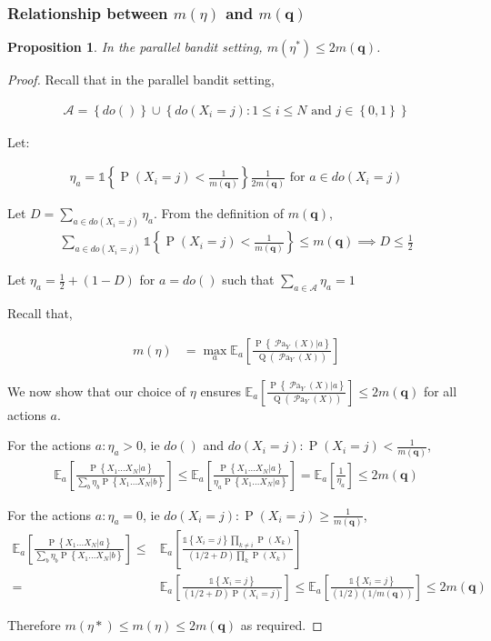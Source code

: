 \documentclass[11pt,a4paper,oneside]{book}
\newcommand{\Q}[1]{\operatorname{Q}\left(#1\right)}
\newcommand{\EE}{\mathbb E}
\newcommand{\EEa}{\EE_a}
\newcommand{\Pn}[2]{\operatorname{P}\left\{#2|#1\right\}}
\newcommand{\calA}{\mathcal A}
\newcommand{\set}[1]{\left\{#1\right\}}
\newcommand{\ind}[1]{\mathds{1}\!\!\set{#1}}
\newcommand{\eq}[1]{\begin{align*}#1\end{align*}}
\renewcommand{\P}[1]{\operatorname{P}\left(#1\right)}
\newcommand{\parents}[1]{\operatorname{\mathcal{P}a}_{#1}}
\theoremstyle{plain}
\newtheorem{proposition}[theorem]{Proposition}
\theoremstyle{definition}
\begin{document}
\subsubsection{Relationship between $m(\eta)$ and $m(\boldsymbol{q})$}\label{sec:m-equivelence}

\begin{proposition} In the parallel bandit setting,
$m(\eta^*) \leq 2m(\boldsymbol{q})$.
\end{proposition} 

\begin{proof}

Recall that in the parallel bandit setting,

\eq{
\mathcal{A} = \set{do()} \cup \set{ do(X_i = j) \colon 1 \leq i \leq N \text{ and } j \in \set{0,1}}
}

Let:

\eq {
\eta_a = \ind{\P{X_i = j} < \frac{1}{m(\boldsymbol{q})}}\frac{1}{2m(\boldsymbol{q})} \text { for } a \in do(X_i = j)
}

Let $D =\sum_{a\in do(X_i=j)}\eta_a$. From the definition of $m(\boldsymbol{q})$, 
\eq {
\sum_{a\in do(X_i=j)} \ind{\P{X_i = j} < \frac{1}{m(\boldsymbol{q})}} \leq m(\boldsymbol{q}) \implies D \leq \frac{1}{2}
}
 
Let $\eta_a = \frac{1}{2} + (1-D)$ for $a = do()$ such that $\sum_{a \in \calA}\eta_a = 1$ 

Recall that,

\eq{
m(\eta) &
= \max_a \EEa\left[\frac{\Pn{a}{\parents{Y}(X)}}{\Q{\parents{Y}(X)}}\right]
}

We now show that our choice of $\eta$ ensures $\EEa\left[\frac{\Pn{a}{\parents{Y}(X)}}{\Q{\parents{Y}(X)}}\right] \leq 2m(\boldsymbol{q})$ for all actions $a$.

For the actions $a: \eta_a > 0$, ie $do()$ and $do(X_i = j):\P{X_i=j}<\frac{1}{m(\boldsymbol{q})}$,
\eq{
\EEa\left[\frac{\Pn{a}{X_1...X_N}}{\sum_{b}\eta_b\Pn{b}{X_1...X_N}}\right] \leq \EEa\left[\frac{\Pn{a}{X_1...X_N}}{\eta_a\Pn{a}{X_1...X_N}}\right] = \EEa\left[\frac{1}{\eta_a}\right] \leq 2m(\boldsymbol{q})
}

For the actions $a :\eta_a = 0$, ie $do(X_i=j):\P{X_i=j}\geq\frac{1}{m(\boldsymbol{q})}$,
\eq{
\EEa\left[\frac{\Pn{a}{X_1...X_N}}{\sum_{b}\eta_b\Pn{b}{X_1...X_N}}\right] \leq & \EEa\left[\frac{\ind{X_i=j}\prod_{k\neq i}\P{X_k}}{(1/2+D)\prod_k \P{X_k}}\right] \\=& \EEa\left[\frac{\ind{X_i=j}}{(1/2+D)\P{X_i = j}}\right]
\leq  \EEa\left[\frac{\ind{X_i=j}}{(1/2)(1/m(\boldsymbol{q}))}\right] \leq 2m(\boldsymbol{q})
}

Therefore $m(\eta*) \leq m(\eta) \leq 2m(\boldsymbol{q})$ as required.

\end{proof}
\end{document}
